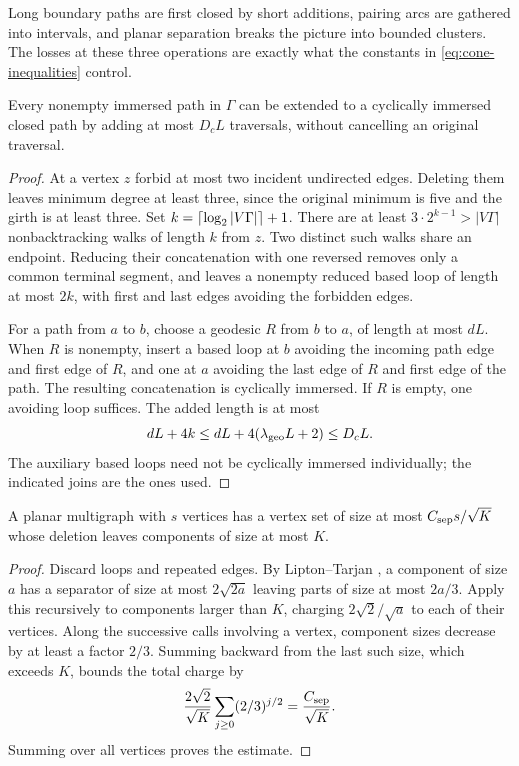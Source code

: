 Long boundary paths are first closed by short additions, pairing arcs are gathered into intervals, and planar separation breaks the picture into bounded clusters. The losses at these three operations are exactly what the constants in \eqref{eq:cone-inequalities} control.
\begin{lemma}\label{lem:short-closure}
Every nonempty immersed path in $\Gamma$ can be extended to a cyclically immersed closed path by adding at most $D_cL$ traversals, without cancelling an original traversal.
\end{lemma}
\begin{proof}
At a vertex $z$ forbid at most two incident undirected edges. Deleting them leaves minimum degree at least three, since the original minimum is five and the girth is at least three. Set $k=\left\lceil \log_2|V\Gamma|\right\rceil+1$. There are at least $3\cdot2^{k-1}>|V\Gamma|$ nonbacktracking walks of length $k$ from $z$. Two distinct such walks share an endpoint. Reducing their concatenation with one reversed removes only a common terminal segment, and leaves a nonempty reduced based loop of length at most $2k$, with first and last edges avoiding the forbidden edges.

For a path from $a$ to $b$, choose a geodesic $R$ from $b$ to $a$, of length at most $dL$. When $R$ is nonempty, insert a based loop at $b$ avoiding the incoming path edge and first edge of $R$, and one at $a$ avoiding the last edge of $R$ and first edge of the path. The resulting concatenation is cyclically immersed. If $R$ is empty, one avoiding loop suffices. The added length is at most
\[
 dL+4k\le dL+4(\lambda_{\rm geo}L+2)\le D_cL.
\]
The auxiliary based loops need not be cyclically immersed individually; the indicated joins are the ones used.
\end{proof}

\begin{lemma}\label{lem:separator}
A planar multigraph with $s$ vertices has a vertex set of size at most $C_{\rm sep}s/\sqrt K$ whose deletion leaves components of size at most $K$.
\end{lemma}
\begin{proof}
Discard loops and repeated edges. By Lipton--Tarjan \cite[Corollary~2]{LT79}, a component of size $a$ has a separator of size at most $2\sqrt{2a}$ leaving parts of size at most $2a/3$. Apply this recursively to components larger than $K$, charging $2\sqrt2/\sqrt a$ to each of their vertices. Along the successive calls involving a vertex, component sizes decrease by at least a factor $2/3$. Summing backward from the last such size, which exceeds $K$, bounds the total charge by
\[
 \frac{2\sqrt2}{\sqrt K}\sum_{j\ge0}(2/3)^{j/2}
 =\frac{C_{\rm sep}}{\sqrt K}.
\]
Summing over all vertices proves the estimate.
\end{proof}

